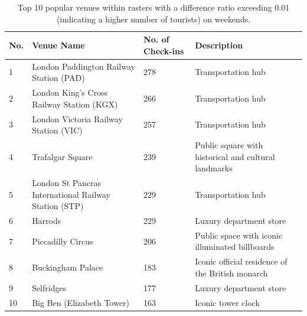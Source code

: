 \documentclass{article}
\theoremstyle{remark}
\begin{document}
\begin{table}[!h]
\centering
\caption{\label{tab:popular_venues_touristspop_weekend}Top 10 popular venues within rasters with a difference ratio exceeding 0.01 (indicating a higher number of tourists) on weekends.}
\begin{adjustbox}{max width=\textwidth, margin=0cm}
\begin{threeparttable}
\begin{tabular}{lp{5cm}lp{4cm}} \hline
No. & Venue Name & No. of Check-ins & Description \\ \hline
1 & London Paddington Railway Station (PAD) & 278 & Transportation hub \\
2 & London King's Cross Railway Station (KGX) & 266 & Transportation hub \\
3 & London Victoria Railway Station (VIC) & 257 & Transportation hub \\
4 & Trafalgar Square & 239 & Public square with historical and cultural landmarks \\
5 & London St Pancras International Railway Station (STP) & 229 & Transportation hub \\
6 & Harrods & 229 & Luxury department store \\
7 & Piccadilly Circus & 206 & Public space with iconic illuminated billboards \\
8 & Buckingham Palace & 183 & Iconic official residence of the British monarch \\
9 & Selfridges & 177 & Luxury department store \\
10 & Big Ben (Elizabeth Tower) & 163 & Iconic tower clock \\ \hline
\end{tabular}
\end{threeparttable}
\end{adjustbox}
\end{table}
\end{document}
